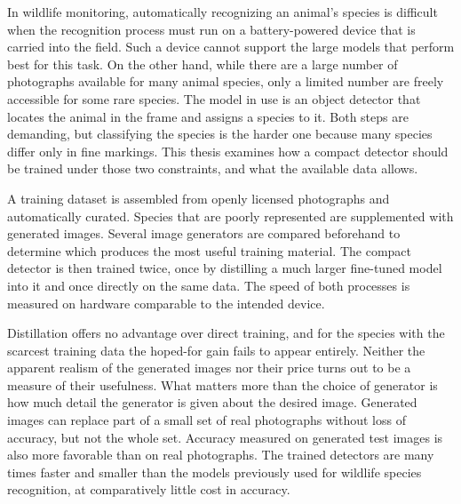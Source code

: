 In wildlife monitoring, automatically recognizing an animal's species is difficult when the recognition process must run on a battery-powered device that is carried into the field. Such a device cannot support the large models that perform best for this task. On the other hand, while there are a large number of photographs available for many animal species, only a limited number are freely accessible for some rare species. The model in use is an object detector that locates the animal in the frame and assigns a species to it. Both steps are demanding, but classifying the species is the harder one because many species differ only in fine markings. This thesis examines how a compact detector should be trained under those two constraints, and what the available data allows.

A training dataset is assembled from openly licensed photographs and automatically curated. Species that are poorly represented are supplemented with generated images. Several image generators are compared beforehand to determine which produces the most useful training material. The compact detector is then trained twice, once by distilling a much larger fine-tuned model into it and once directly on the same data. The speed of both processes is measured on hardware comparable to the intended device.

Distillation offers no advantage over direct training, and for the species with the scarcest training data the hoped-for gain fails to appear entirely. Neither the apparent realism of the generated images nor their price turns out to be a measure of their usefulness. What matters more than the choice of generator is how much detail the generator is given about the desired image. Generated images can replace part of a small set of real photographs without loss of accuracy, but not the whole set. Accuracy measured on generated test images is also more favorable than on real photographs. The trained detectors are many times faster and smaller than the models previously used for wildlife species recognition, at comparatively little cost in accuracy.
